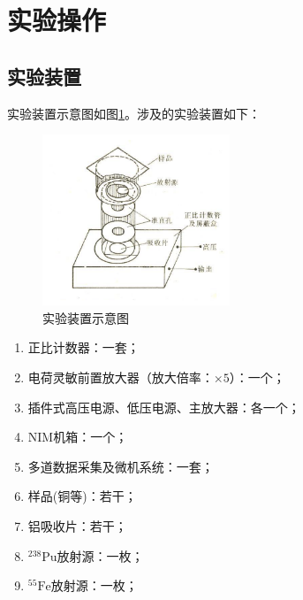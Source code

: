 \documentclass{article}
\begin{document}
    \section{实验操作}
    \subsection{实验装置}
    实验装置示意图如图\ref{fig:ExpIns}。涉及的实验装置如下：
    \begin{figure}[htbp]
        \centering
        \includegraphics[width=0.5\textwidth]{../plot/ExpIns.png}
        \caption{实验装置示意图\label{fig:ExpIns}}
    \end{figure}
    \begin{enumerate}
        \item 正比计数器：一套；
        \item 电荷灵敏前置放大器（放大倍率：$\times 5$）：一个；
        \item 插件式高压电源、低压电源、主放大器：各一个；
        \item NIM机箱：一个；
        \item 多道数据采集及微机系统：一套；
        \item 样品(铜等)：若干；
        \item 铝吸收片：若干；
        \item $^{238}\text{Pu}$放射源：一枚；
        \item $^{55}\text{Fe}$放射源：一枚；
    \end{enumerate}
\end{document}
